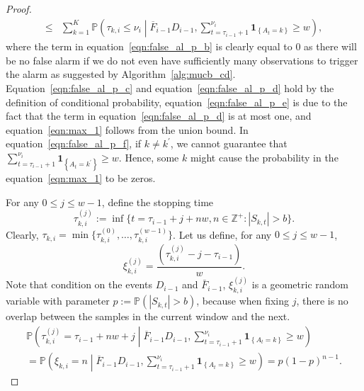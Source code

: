 \documentclass[twoside]{article}
\def\eqref#1{equation~\ref{#1}}
\def\Eqref#1{Equation~\ref{#1}}
\def\1{\bm{1}}
\theoremstyle{plain}
\theoremstyle{definition}
\theoremstyle{remark}
\begin{document}
\begin{proof}
\begin{subequations}
\begin{align}
            \leq & \sum^{K}_{k=1}\mathbb{P}\left(\tau_{k,i}\leq \nu_{i}\middle|\overline{F}_{i-1}D_{i-1}, \sum_{t=\tau_{i-1}+1}^{\nu_{i}}\1_{\left\{A_{t}=k\right\}}\geq w\right), \label{eqn:false_al_p_f}
        \end{align}
    \end{subequations}
    where the term in \eqref{eqn:false_al_p_b} is clearly equal to $0$ as there will be no false alarm if we do not even have sufficiently many observations to trigger the alarm as suggested by Algorithm~\ref{alg:mucb_cd}. \Eqref{eqn:false_al_p_c} and \eqref{eqn:false_al_p_d} hold by the definition of conditional probability, \eqref{eqn:false_al_p_e} is due to the fact that the term in \eqref{eqn:false_al_p_d} is at most one, and \eqref{eqn:max_1} follows from the union bound. In \eqref{eqn:false_al_p_f}, if $k\neq k^{\prime}$, we cannot  guarantee that $\sum_{t=\tau_{i-1}+1}^{\nu_{i}}\1_{\left\{A_{t}=k^{\prime}\right\}}\geq w$. Hence, some $k$ might cause the probability in the \eqref{eqn:max_1} to be zeros. 
 
    For any $0\leq j\leq w-1$, define the stopping time
    \begin{equation}
        \tau_{k,i}^{(j)}:=\inf \{t=\tau_{i-1} + j+nw,n\in\mathbb{Z}^{+}:\left\lvert S_{k,t}\right\rvert >b\}.
    \end{equation}
    Clearly, $\tau_{k,i}=\min\{\tau_{k,i}^{(0)},\ldots,\tau_{k,i}^{(w-1)}\}$. Let us define, for any $0\leq j\leq w-1$,
    \begin{equation}
        \xi_{k,i}^{(j)}=\frac{\left(\tau_{k,i}^{(j)}-j-\tau_{i-1}\right)}{w}.
    \end{equation}
    Note that condition on the events $D_{i-1}$ and $\bar{F}_{i-1}$, $\xi_{k, i}^{(j)}$ is a geometric random variable with parameter $p := \mathbb{P }(\left\lvert S_{k,t}\right\rvert>b)$, because when fixing $j$, there is no overlap between the samples in the current window and the next.
    \begin{multline}
        \mathbb{P}\left(\tau_{k,i}^{(j)}=\tau_{i-1}+nw+j\middle|\overline{F}_{i-1}D_{i-1},\sum_{t=\tau_{i-1}+1}^{\nu_{i}}\1_{\left\{A_{t}=k\right\}}\geq w\right)\\=
            \mathbb{P}\left(\xi_{k,i} = n\middle|\overline{F}_{i-1}D_{i-1},\sum_{t=\tau_{i-1}+1}^{\nu_{i}}\1_{\left\{A_{t}=k\right\}}\geq w\right)
            =p(1-p)^{n-1}.
    \end{multline}


\end{proof}
\end{document}
